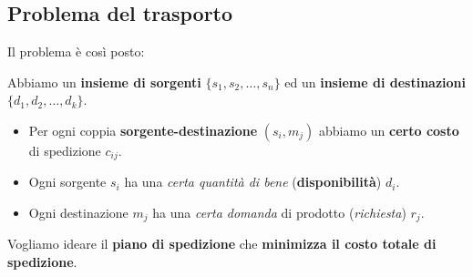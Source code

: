 \subsection{Problema del trasporto}

Il problema è così posto:

\begin{definition}
    Abbiamo un \textbf{insieme di sorgenti} $\{s_{1},s_{2},\ldots ,s_n\}  $ ed un 
    \textbf{insieme di destinazioni} $\{d_{1},d_{2},\ldots ,d_k\}  $.
    \begin{itemize}
        \item Per ogni coppia \textbf{sorgente-destinazione} $(s_i, m_j)$ 
            abbiamo un \textbf{certo costo} di spedizione $c_{ij}$.
        \item Ogni sorgente $s_i$ ha una \textit{certa quantità di bene}
            (\textbf{disponibilità}) $d_i$.
        \item Ogni destinazione $m_j$ ha una \textit{certa domanda} 
            di prodotto (\textit{richiesta}) $r_j$.
    \end{itemize}

    Vogliamo ideare il \textbf{piano di spedizione} che \textbf{minimizza
    il costo totale di spedizione}.
\end{definition}

